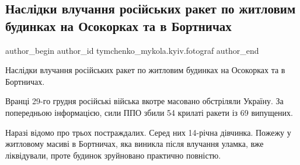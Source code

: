  
 
 
 
 
 
\subsection{Наслідки влучання російських ракет по житловим будинках на Осокорках та в Бортничах}
\label{sec:29_12_2022.fb.tymchenko_mykola.kyiv.fotograf.1.rakety_osokorki_bortnichi}
 
\ifcmt
 author_begin
   author_id tymchenko_mykola.kyiv.fotograf
 author_end
\fi

Наслідки влучання російських ракет по житловим будинках на Осокорках та в Бортничах.

Вранці 29-го грудня російські війська вкотре масовано обстріляли Україну. За
попередньою інформацією, сили ППО збили 54 крилаті ракети із 69 випущених.

Наразі відомо про трьох постраждалих. Серед них 14-річна дівчинка. Пожежу у
житловому масиві в Бортничах, яка виникла після влучання уламка, вже
ліквідували, проте будинок зруйновано практично повністю.

